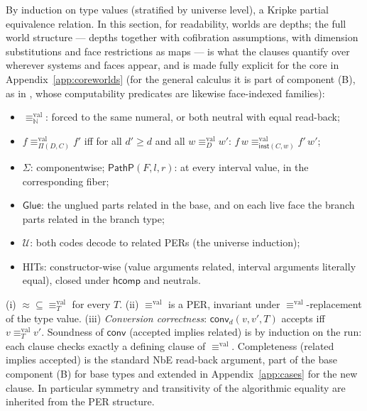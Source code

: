 \documentclass{lmcs}
\newcommand{\hcomp}{\mathsf{hcomp}}
\newcommand{\Glue}{\mathsf{Glue}}
\newcommand{\repeq}{\approx}
\newcommand{\valeq}{\equiv^{\mathrm{val}}}
\newcommand{\U}{\mathcal{U}}
\newcommand{\convop}{\mathsf{conv}}
\newcommand{\capp}{\mathsf{inst}}
\begin{document}
\begin{defi}[$\valeq$]\label{def:valeq}
  By induction on type values (stratified by universe level), a
  Kripke partial equivalence relation.  In this section, for
  readability, worlds are depths; the full world structure ---
  depths together with cofibration assumptions, with dimension
  substitutions and face restrictions as maps --- is what the
  clauses quantify over wherever systems and faces appear, and is
  made fully explicit for the core in
  Appendix~\ref{app:coreworlds} (for the general calculus it is
  part of component (B), as in \cite{HuberNorm}, whose
  computability predicates are likewise face-indexed families):
  \begin{itemize}
  \item $\valeq_{\mathbb{N}}$: forced to the same numeral, or both
    neutral with equal read-back;
  \item $f \valeq_{\Pi(D,C)} f'$ iff for all $d' \ge d$ and all
    $w \valeq_D w'$:
    $f\,w \valeq_{\capp(C,w)} f'\,w'$;
  \item $\Sigma$: componentwise; $\mathsf{PathP}(F,l,r)$: at every
    interval value, in the corresponding fiber;
  \item $\Glue$: the unglued parts related in the base, and on each
    live face the branch parts related in the branch type;
  \item $\U$: both codes decode to related PERs (the universe
    induction);
  \item HITs: constructor-wise (value arguments related, interval
    arguments literally equal), closed under $\hcomp$ and neutrals.
  \end{itemize}
\end{defi}

\begin{lem}\label{lem:valeqbasics}
  (i) $\repeq \subseteq \valeq_T$ for every $T$.
  (ii) $\valeq$ is a PER, invariant under $\valeq$-replacement of the
  type value.
  (iii) \emph{Conversion correctness}: $\convop_d(v, v', T)$ accepts
  iff $v \valeq_T v'$.  Soundness of $\convop$ (accepted implies
  related) is by induction on the run: each clause checks exactly a
  defining clause of $\valeq$.  Completeness (related implies
  accepted) is the standard NbE read-back argument, part of the base
  component (B) for base types and extended in
  Appendix~\ref{app:cases} for the new clause.
  In particular symmetry and transitivity of the algorithmic
  equality are inherited from the PER structure.
\end{lem}
\end{document}
